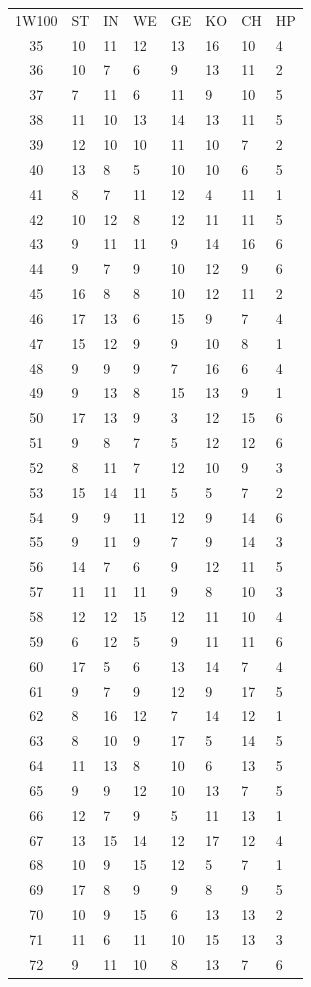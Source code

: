 \documentclass[11pt]{wbzine}
\begin{document}
\begin{tabularx}{\textwidth}{cYYYYYYY}
1W100 & ST & IN & WE & GE & KO & CH & HP \\
    35 & 10 & 11 & 12 & 13 & 16 & 10 & 4 \\ 
    36 & 10 & 7 & 6 & 9 & 13 & 11 & 2 \\
    37 & 7 & 11 & 6 & 11 & 9 & 10 & 5 \\
    38 & 11 & 10 & 13 & 14 & 13 & 11 & 5 \\
    39 & 12 & 10 & 10 & 11 & 10 & 7 & 2 \\ 
    40 & 13 & 8 & 5 & 10 & 10 & 6 & 5 \\ 
    41 & 8 & 7 & 11 & 12 & 4 & 11 & 1 \\ 
    42 & 10 & 12 & 8 & 12 & 11 & 11 & 5 \\ 
    43 & 9 & 11 & 11 & 9 & 14 & 16 & 6 \\ 
    44 & 9 & 7 & 9 & 10 & 12 & 9 & 6 \\ 
    45 & 16 & 8 & 8 & 10 & 12 & 11 & 2 \\
    46 & 17 & 13 & 6 & 15 & 9 & 7 & 4 \\ 
    47 & 15 & 12 & 9 & 9 & 10 & 8 & 1 \\ 
    48 & 9 & 9 & 9 & 7 & 16 & 6 & 4 \\ 
    49 & 9 & 13 & 8 & 15 & 13 & 9 & 1 \\
    50 & 17 & 13 & 9 & 3 & 12 & 15 & 6 \\ 
    51 & 9 & 8 & 7 & 5 & 12 & 12 & 6 \\
    52 & 8 & 11 & 7 & 12 & 10 & 9 & 3 \\ 
    53 & 15 & 14 & 11 & 5 & 5 & 7 & 2 \\ 
    54 & 9 & 9 & 11 & 12 & 9 & 14 & 6 \\ 
    55 & 9 & 11 & 9 & 7 & 9 & 14 & 3 \\ 
    56 & 14 & 7 & 6 & 9 & 12 & 11 & 5 \\ 
    57 & 11 & 11 & 11 & 9 & 8 & 10 & 3 \\
    58 & 12 & 12 & 15 & 12 & 11 & 10 & 4 \\
    59 & 6 & 12 & 5 & 9 & 11 & 11 & 6 \\ 
  60 & 17 & 5 & 6 & 13 & 14 & 7 & 4 \\ 
  61 & 9 & 7 & 9 & 12 & 9 & 17 & 5 \\ 
  62 & 8 & 16 & 12 & 7 & 14 & 12 & 1 \\ 
  63 & 8 & 10 & 9 & 17 & 5 & 14 & 5 \\ 
  64 & 11 & 13 & 8 & 10 & 6 & 13 & 5 \\ 
  65 & 9 & 9 & 12 & 10 & 13 & 7 & 5 \\ 
  66 & 12 & 7 & 9 & 5 & 11 & 13 & 1 \\
  67 & 13 & 15 & 14 & 12 & 17 & 12 & 4 \\ 
  68 & 10 & 9 & 15 & 12 & 5 & 7 & 1 \\
  69 & 17 & 8 & 9 & 9 & 8 & 9 & 5 \\ 
  70 & 10 & 9 & 15 & 6 & 13 & 13 & 2 \\
  71 & 11 & 6 & 11 & 10 & 15 & 13 & 3 \\ 
  72 & 9 & 11 & 10 & 8 & 13 & 7 & 6 \\
\end{tabularx}
\end{document}
